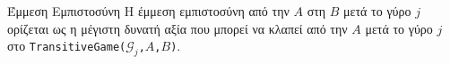 {}
\begin{definitiongr}{Έμμεση Εμπιστοσύνη}
  Η έμμεση εμπιστοσύνη από την $A$ στη $B$ μετά το γύρο $j$ ορίζεται ως η μέγιστη δυνατή αξία που μπορεί να κλαπεί από την $A$
  μετά το γύρο $j$ στο \texttt{\textlatin{TransitiveGame}(}$\mathcal{G}_j$\texttt{,}$A$\texttt{,}$B$\texttt{)}.
\end{definitiongr}
